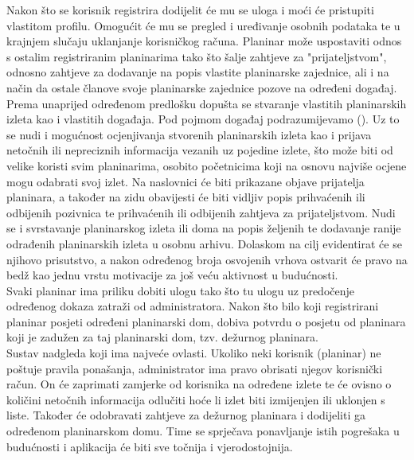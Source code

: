 		Nakon što se korisnik registrira dodijelit će mu se uloga  i moći će pristupiti vlastitom profilu. Omogućit će mu se pregled i uređivanje osobnih podataka te u krajnjem slučaju uklanjanje korisničkog računa. Planinar može uspostaviti odnos s ostalim registriranim planinarima tako što šalje zahtjeve za "prijateljstvom", odnosno zahtjeve za dodavanje na popis vlastite planinarske zajednice, ali i na način da ostale članove svoje planinarske zajednice pozove na određeni događaj. Prema unaprijed određenom predlošku dopušta se stvaranje vlastitih planinarskih izleta kao i vlastitih događaja. Pod pojmom događaj podrazumijevamo (). Uz to se nudi i mogućnost ocjenjivanja stvorenih planinarskih izleta kao i prijava netočnih ili nepreciznih informacija vezanih uz pojedine izlete, što može biti od velike koristi svim planinarima, osobito početnicima koji na osnovu najviše ocjene mogu odabrati svoj izlet. Na naslovnici će biti prikazane objave prijatelja planinara, a također na zidu obavijesti će biti vidljiv popis prihvaćenih ili odbijenih pozivnica te prihvaćenih ili odbijenih zahtjeva za prijateljstvom. Nudi se i svrstavanje planinarskog izleta ili doma na popis željenih te dodavanje ranije odrađenih planinarskih izleta u osobnu arhivu. Dolaskom na cilj evidentirat će se njihovo prisutstvo, a nakon određenog broja osvojenih vrhova ostvarit će pravo na bedž kao jednu vrstu motivacije za još veću aktivnost u budućnosti. \\
		
		Svaki planinar ima priliku dobiti ulogu  tako što tu ulogu uz predočenje određenog dokaza zatraži od administratora. Nakon što bilo koji registrirani planinar posjeti određeni planinarski dom, dobiva potvrdu o posjetu od planinara koji je zadužen za taj planinarski dom, tzv. dežurnog planinara.\\
		
		Sustav nadgleda  koji ima najveće ovlasti. Ukoliko neki korisnik (planinar) ne poštuje pravila ponašanja, administrator ima pravo obrisati njegov korisnički račun. On će zaprimati zamjerke od korisnika na određene izlete te će ovisno o količini netočnih informacija odlučiti hoće li izlet biti izmijenjen ili uklonjen s liste. Također će odobravati zahtjeve za dežurnog planinara i dodijeliti ga određenom planinarskom domu. Time se sprječava ponavljanje istih pogrešaka u budućnosti i aplikacija će biti sve točnija i vjerodostojnija. 
		
		
